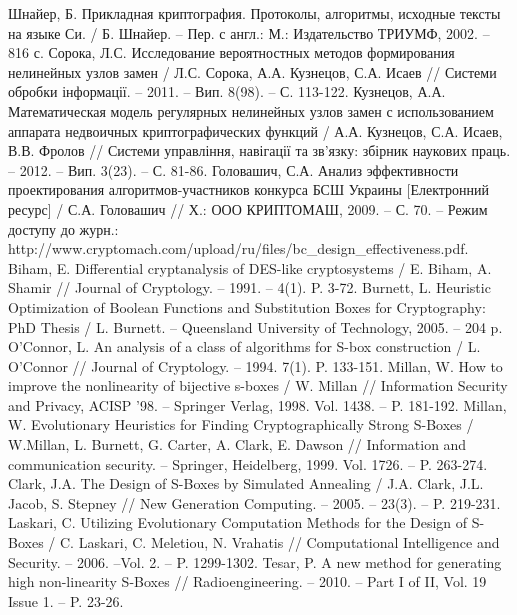 \renewcommand\bibname{Перечень ссылок}

\begin{thebibliography}{}
     Шнайер, Б. Прикладная криптография. Протоколы, алгоритмы, исходные тексты на языке Си. / Б. Шнайер. -- Пер. с англ.: М.: Издательство ТРИУМФ, 2002. -- 816 с.
     Сорока, Л.С. Исследование вероятностных методов формирования нелинейных узлов замен / Л.С. Сорока, А.А. Кузнецов, С.А. Исаев // Системи обробки інформації. -- 2011. -- Вип. 8(98). -- С. 113-122.
     Кузнецов, А.А. Математическая модель регулярных нелинейных узлов замен с использованием аппарата недвоичных криптографических функций / А.А. Кузнецов, С.А. Исаев, В.В. Фролов // Системи управління, навігації та зв’язку: збірник наукових праць. -- 2012. -- Вип. 3(23). -- С. 81-86.
     Головашич, С.А. Анализ эффективности проектирования алгоритмов-участников конкурса БСШ Украины [Електронний ресурс] / С.А. Головашич // Х.: ООО КРИПТОМАШ, 2009. -- С. 70. -- Режим доступу до журн.: http://www.cryptomach.com/upload/ru/files/bc\_design\_effectiveness.pdf.
     Biham, E. Differential cryptanalysis of DES-like cryptosystems / E. Biham, A. Shamir // Journal of Cryptology. -- 1991. -- 4(1). P. 3-72.
     Burnett, L. Heuristic Optimization of Boolean Functions and Substitution Boxes for Cryptography: PhD Thesis / L. Burnett. -- Queensland University of Technology, 2005. -- 204 p.
     O’Connor, L. An analysis of a class of algorithms for S-box construction / L. O'Connor // Journal of Cryptology. -- 1994.  7(1). P. 133-151.
     Millan, W. How to improve the nonlinearity of bijective s-boxes / W. Millan // Information Security and Privacy, ACISP '98. -- Springer Verlag, 1998.  Vol. 1438. -- P. 181-192.
     Millan, W. Evolutionary Heuristics for Finding Cryptographically Strong S-Boxes / W.Millan, L. Burnett, G. Carter, A. Clark, E. Dawson // Information and communication security. -- Springer, Heidelberg, 1999. Vol. 1726. -- P. 263-274.
     Clark, J.A.  The Design of S-Boxes by Simulated Annealing / J.A. Clark, J.L. Jacob, S. Stepney // New Generation Computing. -- 2005. -- 23(3). -- P. 219-231.
     Laskari, C. Utilizing Evolutionary Computation Methods for the Design of S-Boxes / C. Laskari, C. Meletiou, N. Vrahatis // Computational Intelligence and Security. -- 2006. --Vol. 2. -- P. 1299-1302.
     Tesar, P. A new method for generating high non-linearity S-Boxes // Radioengineering. -- 2010. -- Part I of II, Vol. 19 Issue 1. -- P. 23-26.

\end{thebibliography}
